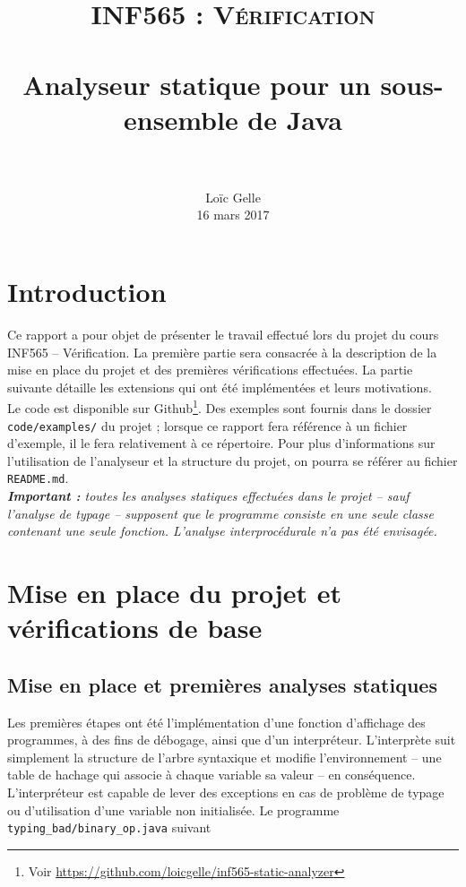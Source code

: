 \documentclass[paper=a4, fontsize=11pt]{scrartcl}
\title{	
		\usefont{OT1}{bch}{b}{n}
		\normalfont \normalsize \textsc{INF565 : Vérification} \\ [25pt]
		\horrule{0.5pt} \\[0.4cm]
		\huge Analyseur statique pour un sous-ensemble de Java \\
		\horrule{2pt} \\[0.5cm]
}
\author{
		\normalfont 								\normalsize
        Lo\"{i}c Gelle\\[-3pt]		\normalsize
        16 mars 2017
}
\date{}
\numberwithin{figure}{section}			%
\numberwithin{table}{section}				%
\begin{document}
\maketitle
\section{Introduction}

Ce rapport a pour objet de présenter le travail effectué lors du projet du cours INF565 -- Vérification. La première partie sera consacrée à la description de la mise en place du projet et des premières vérifications effectuées. La partie suivante détaille les extensions qui ont été implémentées et leurs motivations.\\

Le code est disponible sur Github\footnote{Voir \url{https://github.com/loicgelle/inf565-static-analyzer}}. Des exemples sont fournis dans le dossier \texttt{code/examples/} du projet ; lorsque ce rapport fera référence à un fichier d'exemple, il le fera relativement à ce répertoire. Pour plus d'informations sur l'utilisation de l'analyseur et la structure du projet, on pourra se référer au fichier \texttt{README.md}.\\

\textit{\textbf{Important :} toutes les analyses statiques effectuées dans le projet -- sauf l'analyse de typage -- supposent que le programme consiste en une seule classe contenant une seule fonction. L'analyse interprocédurale n'a pas été envisagée.}

\section{Mise en place du projet et vérifications de base}

\subsection{Mise en place et premières analyses statiques}

Les premières étapes ont été l'implémentation d'une fonction d'affichage des programmes, à des fins de débogage, ainsi que d'un interpréteur. L'interprète suit simplement la structure de l'arbre syntaxique et modifie l'environnement -- une table de hachage qui associe à chaque variable sa valeur -- en conséquence.\\

L'interpréteur est capable de lever des exceptions en cas de problème de typage ou d'utilisation d'une variable non initialisée. Le programme \texttt{typing\_bad/binary\_op.java} suivant
\end{document}
